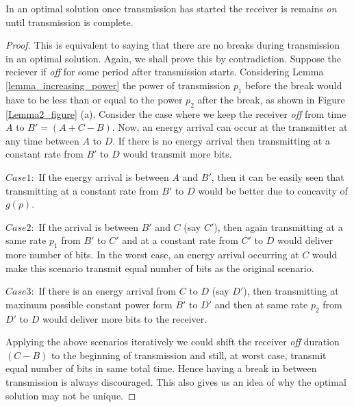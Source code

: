 \begin{lemma}
In an optimal solution once transmission has started the receiver is remains \textit{on} until transmission is complete. \label{lemma_nobreaks}
\end{lemma}
\begin{proof}
This is equivalent to saying that there are no breaks during transmission in an optimal solution. Again, we shall prove this by contradiction. Suppose the reciever if \textit{off} for some period after transmission starts. Considering Lemma \ref{lemma_increasing_power} the power of transmission $p_1$ before the break would have to be less than or equal to the power $p_2$ after the break, as shown in Figure \ref{Lemma2_figure} (a). Consider the case where we keep the receiver \textit{off} from time $A$ to $B'=(A+C-B)$. Now, an energy arrival can occur at the transmitter at any time between $A$ to $D$. If there is no energy arrival then transmitting at a constant rate from $B'$ to $D$ would transmit more bits.

$Case 1:$ If the energy arrival is between $A$ and $B'$, then it can be easily seen that transmitting at a constant rate from $B'$ to $D$ would be better due to concavity of $g(p)$.

$Case 2:$ If the arrival is between $B'$ and $C$ (say $C'$), then again transmitting at a same rate $p_1$ from $B'$ to $C'$ and  at a constant rate from $C'$ to $D$ would deliver more number of bits. In the worst case, an energy arrival occurring at $C$ would make this scenario transmit equal number of bits as the original scenario.

$Case 3:$ If there is an energy arrival from $C$ to $D$ (say $D'$), then transmitting at maximum possible constant power form $B'$ to $D'$ and then at same rate $p_2$ from $D'$ to $D$ would deliver more bits to the receiver.

Applying the above scenarios iteratively we could shift the receiver \textit{off} duration $(C-B)$ to the beginning of transmission and still, at worst case, transmit equal number of bits in same total time. Hence having a break in between transmission is always discouraged. This also gives us an idea of why the optimal solution may not be unique.
\end{proof}

